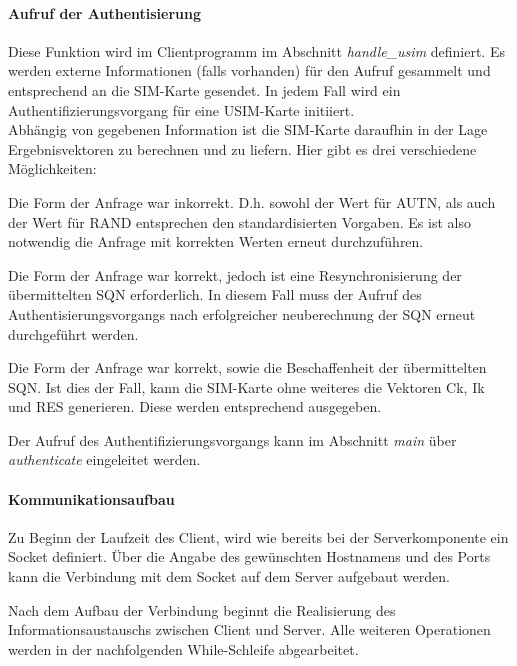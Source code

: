         \paragraph{Aufruf der Authentisierung} Diese Funktion wird im Clientprogramm im Abschnitt
        \textit{handle\_usim} definiert. Es werden externe Informationen (falls vorhanden) für den Aufruf
        gesammelt und entsprechend an die SIM-Karte gesendet. In jedem Fall wird ein Authentifizierungsvorgang
        für eine USIM-Karte initiiert. \\
        Abhängig von gegebenen Information ist die SIM-Karte daraufhin in der Lage Ergebnisvektoren
        zu berechnen und zu liefern. Hier gibt es drei verschiedene Möglichkeiten:
            \begin{addmargin}[1em]{2em}
            Die Form der Anfrage war inkorrekt. D.h. sowohl der Wert für AUTN, als auch der Wert für RAND entsprechen
            den standardisierten Vorgaben. Es ist also notwendig die Anfrage mit korrekten Werten erneut
            durchzuführen.

            Die Form der Anfrage war korrekt, jedoch ist eine Resynchronisierung der übermittelten SQN erforderlich.
            In diesem Fall muss der Aufruf des Authentisierungsvorgangs nach erfolgreicher neuberechnung der SQN
            erneut durchgeführt werden.

            Die Form der Anfrage war korrekt, sowie die Beschaffenheit der übermittelten SQN. Ist dies der Fall,
            kann die SIM-Karte ohne weiteres die Vektoren Ck, Ik und RES generieren. Diese werden entsprechend
            ausgegeben.
            \end{addmargin}
        Der Aufruf des Authentifizierungsvorgangs kann im Abschnitt \textit{main} über \textit{authenticate}
        eingeleitet werden.

        \paragraph{Kommunikationsaufbau} Zu Beginn der Laufzeit des Client, wird wie bereits bei der 
        Serverkomponente ein Socket definiert. Über die Angabe des gewünschten Hostnamens und des Ports
        kann die Verbindung mit dem Socket auf dem Server aufgebaut werden.

        Nach dem Aufbau der Verbindung beginnt die Realisierung des Informationsaustauschs zwischen
        Client und Server.
        Alle weiteren Operationen werden in der nachfolgenden While-Schleife abgearbeitet.

